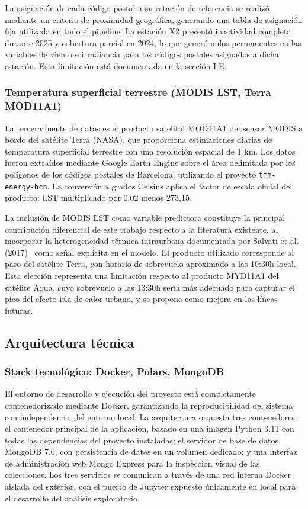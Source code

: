 \documentclass[12pt, a4paper]{article}
\begin{document}
La asignación de cada código postal a su estación de referencia se realizó mediante un criterio de proximidad geográfica, generando una tabla de asignación fija utilizada en todo el pipeline. La estación X2 presentó inactividad completa durante 2025 y cobertura parcial en 2024, lo que generó nulos permanentes en las variables de viento e irradiancia para los códigos postales asignados a dicha estación. Esta limitación está documentada en la sección I.E.

\subsubsection{Temperatura superficial terrestre (MODIS LST, Terra MOD11A1)}


La tercera fuente de datos es el producto satelital MOD11A1 del sensor MODIS a bordo del satélite Terra (NASA), que proporciona estimaciones diarias de temperatura superficial terrestre con una resolución espacial de 1 km. Los datos fueron extraídos mediante Google Earth Engine sobre el área delimitada por los polígonos de los códigos postales de Barcelona, utilizando el proyecto \texttt{tfm-energy-bcn}. La conversión a grados Celsius aplica el factor de escala oficial del producto: LST multiplicado por 0,02 menos 273,15.

La inclusión de MODIS LST como variable predictora constituye la principal contribución diferencial de este trabajo respecto a la literatura existente, al incorporar la heterogeneidad térmica intraurbana documentada por Salvati et al. (2017)~\cite{salvati2017} como señal explícita en el modelo. El producto utilizado corresponde al paso del satélite Terra, con horario de sobrevuelo aproximado a las 10:30h local. Esta elección representa una limitación respecto al producto MYD11A1 del satélite Aqua, cuyo sobrevuelo a las 13:30h sería más adecuado para capturar el pico del efecto isla de calor urbano, y se propone como mejora en las líneas futuras.

\subsection{Arquitectura técnica}


\subsubsection{Stack tecnológico: Docker, Polars, MongoDB}


El entorno de desarrollo y ejecución del proyecto está completamente contenedorizado mediante Docker, garantizando la reproducibilidad del sistema con independencia del entorno local. La arquitectura orquesta tres contenedores: el contenedor principal de la aplicación, basado en una imagen Python 3.11 con todas las dependencias del proyecto instaladas; el servidor de base de datos MongoDB 7.0, con persistencia de datos en un volumen dedicado; y una interfaz de administración web Mongo Express para la inspección visual de las colecciones. Los tres servicios se comunican a través de una red interna Docker aislada del exterior, con el puerto de Jupyter expuesto únicamente en local para el desarrollo del análisis exploratorio.
\end{document}
